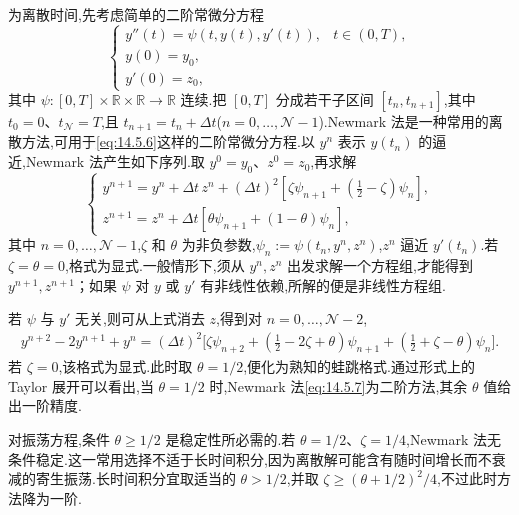 为离散时间,先考虑简单的二阶常微分方程
\begin{equation}\label{eq:14.5.6}
  \begin{cases}
    y''(t)=\psi(t,y(t),y'(t)), & t\in(0,T),\\
    y(0)=y_0,\\
    y'(0)=z_0,
  \end{cases}
\end{equation}
其中 \(\psi\colon[0,T]\times\mathbb R\times\mathbb R\to\mathbb R\) 连续.把 \([0,T]\) 分成若干子区间 \([t_n,t_{n+1}]\),其中 \(t_0=0\)、\(t_{\mathcal N}=T\),且 \(t_{n+1}=t_n+\Delta t\)(\(n=0,\ldots,\mathcal N-1\)).Newmark 法是一种常用的离散方法,可用于\eqref{eq:14.5.6}这样的二阶常微分方程.以 \(y^n\) 表示 \(y(t_n)\) 的逼近,Newmark 法产生如下序列.取 \(y^0=y_0\)、\(z^0=z_0\),再求解
\begin{equation}\label{eq:14.5.7}
  \begin{cases}
    y^{n+1}=y^n+\Delta t\,z^n+(\Delta t)^2
         [\zeta\psi_{n+1}+(\tfrac12-\zeta)\psi_n],\\
    z^{n+1}=z^n+\Delta t[\theta\psi_{n+1}+(1-\theta)\psi_n],
  \end{cases}
\end{equation}
其中 \(n=0,\ldots,\mathcal N-1\),\(\zeta\) 和 \(\theta\) 为非负参数,\(\psi_n:=\psi(t_n,y^n,z^n)\),\(z^n\) 逼近 \(y'(t_n)\).若 \(\zeta=\theta=0\),格式为显式.一般情形下,须从 \(y^n,z^n\) 出发求解一个方程组,才能得到 \(y^{n+1},z^{n+1}\)；如果 \(\psi\) 对 \(y\) 或 \(y'\) 有非线性依赖,所解的便是非线性方程组.

若 \(\psi\) 与 \(y'\) 无关,则可从上式消去 \(z\),得到对 \(n=0,\ldots,\mathcal N-2\),
\begin{equation}\label{eq:14.5.8}
  \begin{aligned}
    y^{n+2}-2y^{n+1}+y^n
      =(\Delta t)^2\bigl[\zeta\psi_{n+2}
        +(\tfrac12-2\zeta+\theta)\psi_{n+1}
        +(\tfrac12+\zeta-\theta)\psi_n\bigr].
  \end{aligned}
\end{equation}
若 \(\zeta=0\),该格式为显式.此时取 \(\theta=1/2\),便化为熟知的蛙跳格式.通过形式上的 Taylor 展开可以看出,当 \(\theta=1/2\) 时,Newmark 法\eqref{eq:14.5.7}为二阶方法,其余 \(\theta\) 值给出一阶精度.

对振荡方程,条件 \(\theta\ge1/2\) 是稳定性所必需的.若 \(\theta=1/2\)、\(\zeta=1/4\),Newmark 法无条件稳定.这一常用选择不适于长时间积分,因为离散解可能含有随时间增长而不衰减的寄生振荡.长时间积分宜取适当的 \(\theta>1/2\),并取 \(\zeta\ge(\theta+1/2)^2/4\),不过此时方法降为一阶.

